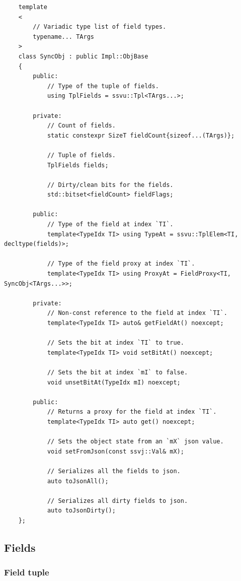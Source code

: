 \documentclass{report}
\def \cppStart {\begin{verbatim}}
\begin{document}
\cppStart
    template
    <
        // Variadic type list of field types.
        typename... TArgs
    > 
    class SyncObj : public Impl::ObjBase
    {
        public:
            // Type of the tuple of fields.
            using TplFields = ssvu::Tpl<TArgs...>;

        private:
            // Count of fields.
            static constexpr SizeT fieldCount{sizeof...(TArgs)};

            // Tuple of fields.
            TplFields fields;

            // Dirty/clean bits for the fields.
            std::bitset<fieldCount> fieldFlags;

        public:
            // Type of the field at index `TI`.
            template<TypeIdx TI> using TypeAt = ssvu::TplElem<TI, decltype(fields)>;

            // Type of the field proxy at index `TI`.
            template<TypeIdx TI> using ProxyAt = FieldProxy<TI, SyncObj<TArgs...>>;

        private:
            // Non-const reference to the field at index `TI`.
            template<TypeIdx TI> auto& getFieldAt() noexcept;

            // Sets the bit at index `TI` to true.
            template<TypeIdx TI> void setBitAt() noexcept;

            // Sets the bit at index `mI` to false.
            void unsetBitAt(TypeIdx mI) noexcept;

        public:
            // Returns a proxy for the field at index `TI`.
            template<TypeIdx TI> auto get() noexcept;

            // Sets the object state from an `mX` json value.
            void setFromJson(const ssvj::Val& mX);

            // Serializes all the fields to json.
            auto toJsonAll();

            // Serializes all dirty fields to json.
            auto toJsonDirty();
    };
\end{verbatim}

            \subsection{Fields}                

                \subsubsection{Field tuple}
\end{document}
